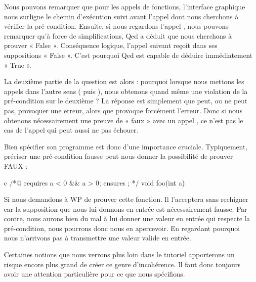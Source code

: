 Nous pouvons remarquer que pour les appels de fonctions, l'interface graphique
nous surligne le chemin d'exécution suivi avant l'appel dont nous cherchons à 
vérifier la pré-condition. Ensuite, si nous regardons l'appel ,
nous pouvons remarquer qu'à force de simplifications, Qed a déduit que nous 
cherchons à prouver « False ». Conséquence logique, l'appel suivant  
reçoit dans ses suppositions « False ». C'est pourquoi Qed est capable de déduire
immédiatement « True ».



La deuxième partie de la question est alors : pourquoi lorsque nous mettons les 
appels dans l'autre sens ( puis ), nous obtenons 
quand même une violation de la pré-condition sur le deuxième ? La réponse est 
simplement que  peut, ou ne peut pas, provoquer une erreur, alors 
que  provoque forcément l'erreur. Donc si nous obtenons 
nécessairement une preuve de « faux » avec un appel , ce n'est
pas le cas de l'appel  qui peut aussi ne pas échouer.



Bien spécifier son programme est donc d'une importance cruciale. Typiquement, 
préciser une pré-condition fausse peut nous donner la possibilité de prouver 
FAUX :



\begin{CodeBlock}{c}
/*@
  requires a < 0 && a > 0;
  ensures  \false;
*/
void foo(int a){

}
\end{CodeBlock}



Si nous demandons à WP de prouver cette fonction. Il l'acceptera sans rechigner
car la supposition que nous lui donnons en entrée est nécessairement fausse. Par
contre, nous aurons bien du mal à lui donner une valeur en entrée qui respecte la 
pré-condition, nous pourrons donc nous en apercevoir. En regardant pourquoi nous
n'arrivons pas à transmettre une valeur valide en entrée.



Certaines notions que nous verrons plus loin dans le tutoriel apporterons un 
risque encore plus grand de créer ce genre d'incohérence. Il faut donc toujours
avoir une attention particulière pour ce que nous spécifions.



